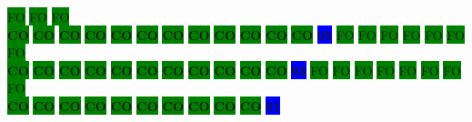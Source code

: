 \colorbox{green}{\color[gray]{0.75}FO}%
\colorbox{green}{\color[gray]{0.75}FO}%
\colorbox{green}{\color[gray]{0.75}FO}%
\\
\colorbox{green}{\color[rgb]{0,0,0}\textbf{CO}}%
\colorbox{green}{\color[rgb]{0,0,0}\textbf{CO}}%
\colorbox{green}{\color[rgb]{0,0,0}\textbf{CO}}%
\colorbox{green}{\color[rgb]{0,0,0}\textbf{CO}}%
\colorbox{green}{\color[rgb]{0,0,0}\textbf{CO}}%
\colorbox{green}{\color[rgb]{0,0,0}\textbf{CO}}%
\colorbox{green}{\color[rgb]{0,0,0}\textbf{CO}}%
\colorbox{green}{\color[rgb]{0,0,0}\textbf{CO}}%
\colorbox{green}{\color[rgb]{0,0,0}\textbf{CO}}%
\colorbox{green}{\color[rgb]{0,0,0}\textbf{CO}}%
\colorbox{green}{\color[rgb]{0,0,0}\textbf{CO}}%
\colorbox{green}{\color[rgb]{0,0,0}\textbf{CO}}%
\colorbox{blue}{\color[rgb]{1,0,0}\textbf{05}}%
\colorbox{green}{\color[gray]{0.75}FO}%
\colorbox{green}{\color[gray]{0.75}FO}%
\colorbox{green}{\color[gray]{0.75}FO}%
\colorbox{green}{\color[gray]{0.75}FO}%
\colorbox{green}{\color[gray]{0.75}FO}%
\colorbox{green}{\color[gray]{0.75}FO}%
\colorbox{green}{\color[gray]{0.75}FO}%
\\
\colorbox{green}{\color[rgb]{0,0,0}\textbf{CO}}%
\colorbox{green}{\color[rgb]{0,0,0}\textbf{CO}}%
\colorbox{green}{\color[rgb]{0,0,0}\textbf{CO}}%
\colorbox{green}{\color[rgb]{0,0,0}\textbf{CO}}%
\colorbox{green}{\color[rgb]{0,0,0}\textbf{CO}}%
\colorbox{green}{\color[rgb]{0,0,0}\textbf{CO}}%
\colorbox{green}{\color[rgb]{0,0,0}\textbf{CO}}%
\colorbox{green}{\color[rgb]{0,0,0}\textbf{CO}}%
\colorbox{green}{\color[rgb]{0,0,0}\textbf{CO}}%
\colorbox{green}{\color[rgb]{0,0,0}\textbf{CO}}%
\colorbox{green}{\color[rgb]{0,0,0}\textbf{CO}}%
\colorbox{blue}{\color[rgb]{1,0,0}\textbf{03}}%
\colorbox{green}{\color[gray]{0.75}FO}%
\colorbox{green}{\color[gray]{0.75}FO}%
\colorbox{green}{\color[gray]{0.75}FO}%
\colorbox{green}{\color[gray]{0.75}FO}%
\colorbox{green}{\color[gray]{0.75}FO}%
\colorbox{green}{\color[gray]{0.75}FO}%
\colorbox{green}{\color[gray]{0.75}FO}%
\colorbox{green}{\color[gray]{0.75}FO}%
\\
\colorbox{green}{\color[rgb]{0,0,0}\textbf{CO}}%
\colorbox{green}{\color[rgb]{0,0,0}\textbf{CO}}%
\colorbox{green}{\color[rgb]{0,0,0}\textbf{CO}}%
\colorbox{green}{\color[rgb]{0,0,0}\textbf{CO}}%
\colorbox{green}{\color[rgb]{0,0,0}\textbf{CO}}%
\colorbox{green}{\color[rgb]{0,0,0}\textbf{CO}}%
\colorbox{green}{\color[rgb]{0,0,0}\textbf{CO}}%
\colorbox{green}{\color[rgb]{0,0,0}\textbf{CO}}%
\colorbox{green}{\color[rgb]{0,0,0}\textbf{CO}}%
\colorbox{green}{\color[rgb]{0,0,0}\textbf{CO}}%
\colorbox{blue}{\color[rgb]{1,0,0}\textbf{01}}%
